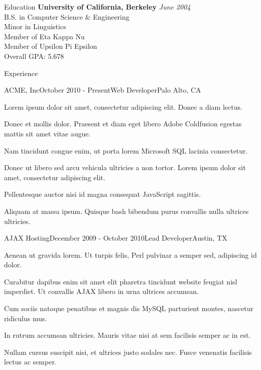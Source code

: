 \documentclass[$page$, line, 11pt]{resume}
\begin{document}
  \begin{rSection}{Education}
    {\bf University of California, Berkeley} \hfill {\em June 2004} \\ 
    { B.S. in Computer Science \& Engineering } \\
    { Minor in Linguistics } \smallskip \\
    { Member of Eta Kappa Nu } \\
    { Member of Upsilon Pi Epsilon } \\
    Overall GPA: 5.678
  \end{rSection}
  
  \begin{rSection}{Experience}
  
    \begin{rSubsection}{ACME, Inc}{October 2010 - Present}{Web Developer}{Palo Alto, CA}
    \item Lorem ipsum dolor sit amet, consectetur adipiscing elit. Donec a diam lectus.
    \item Donec et mollis dolor. Praesent et diam eget libero Adobe Coldfusion egestas mattis sit amet vitae augue.
    \item Nam tincidunt congue enim, ut porta lorem Microsoft SQL lacinia consectetur.
    \item Donec ut libero sed arcu vehicula ultricies a non tortor. Lorem ipsum dolor sit amet, consectetur adipiscing elit.
    \item Pellentesque auctor nisi id magna consequat JavaScript sagittis.
    \item Aliquam at massa ipsum. Quisque bash bibendum purus convallis nulla ultrices ultricies.
    \end{rSubsection}
  
    \begin{rSubsection}{AJAX Hosting}{December 2009 - October 2010}{Lead Developer}{Austin, TX}
    \item Aenean ut gravida lorem. Ut turpis felis, Perl pulvinar a semper sed, adipiscing id dolor.
    \item Curabitur dapibus enim sit amet elit pharetra tincidunt website feugiat nisl imperdiet. Ut convallis AJAX libero in urna ultrices accumsan.
    \item Cum sociis natoque penatibus et magnis dis MySQL parturient montes, nascetur ridiculus mus.
    \item In rutrum accumsan ultricies. Mauris vitae nisi at sem facilisis semper ac in est.
    \item Nullam cursus suscipit nisi, et ultrices justo sodales nec. Fusce venenatis facilisis lectus ac semper.
    \end{rSubsection}


\end{rSection}
\end{document}
